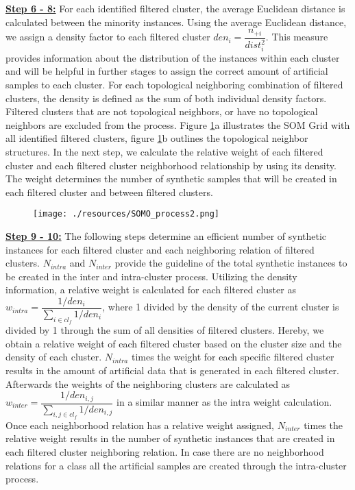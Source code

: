 \documentclass[parskip=full]{scrartcl}
\begin{document}
\textbf{\underline{Step 6 - 8:}} For each identified filtered cluster, the
average Euclidean distance is calculated between the minority instances. Using
the average Euclidean distance, we assign a density factor to each filtered
cluster $den_{i} = \dfrac{n_{+i}}{dist_{i}^2}$. This measure provides
information about the distribution of the instances within each cluster and will
be helpful in further stages to assign the correct amount of artificial samples
to each cluster. For each topological neighboring combination of filtered
clusters, the density is defined as the sum of both individual density factors.
Filtered clusters that are not topological neighbors, or have no topological
neighbors are excluded from the process. Figure \ref{fig:Somo_Overview}a
illustrates the SOM Grid with all identified filtered clusters, figure
\ref{fig:Somo_Overview}b outlines the topological neighbor structures. In the
next step, we calculate the relative weight of each filtered cluster and each
filtered cluster neighborhood relationship by using its density. The weight
determines the number of synthetic samples that will be created in each filtered
cluster and between filtered clusters. 

\begin{figure}[H]
	\centering
	\texttt{[image: ./resources/SOMO\_process2.png]}
	\label{fig:Somo_Overview}
\end{figure}

\textbf{\underline{Step 9 - 10:}} The following steps determine an efficient
number of synthetic instances for each filtered cluster and each neighboring
relation of filtered clusters. $N_{intra}$ and $N_{inter}$ provide the guideline
of the total synthetic instances to be created in the inter and intra-cluster
process. Utilizing the density information, a relative weight is calculated for
each filtered cluster as $w_{intra} = \dfrac{1 / den_{i}}{\sum_{i \in cl_{f}}
1/den_{i}}$, where 1 divided by the density of the current cluster is divided by
1 through the sum of all densities of filtered clusters. Hereby, we obtain a
relative weight of each filtered cluster based on the cluster size and the
density of each cluster. $N_{intra}$ times the weight for each specific filtered
cluster results in the amount of artificial data that is generated in each
filtered cluster. Afterwards the weights of the neighboring clusters are
calculated as $w_{inter} = \dfrac{1 / den_{i,j}}{\sum_{i,j \in cl_{f}}
1/den_{i,j}}$ in a similar manner as the intra weight calculation. Once each
neighborhood relation has a relative weight assigned, $N_{inter}$ times the
relative weight results in the number of synthetic instances that are created in
each filtered cluster neighboring relation. In case there are no neighborhood
relations for a class all the artificial samples are created through the
intra-cluster process. 
\end{document}
